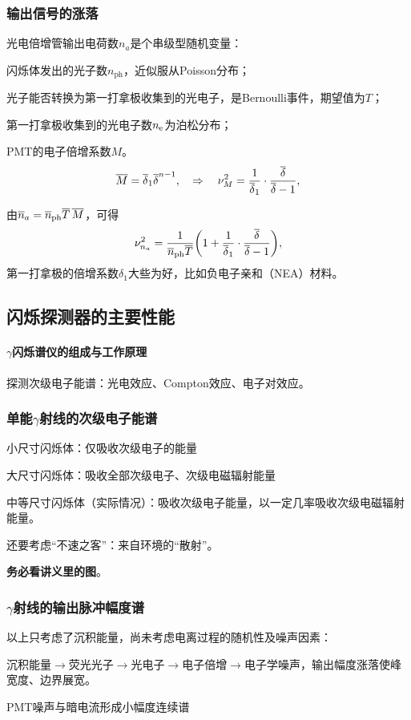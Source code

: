 \subsubsection{输出信号的涨落}
光电倍增管输出电荷数$n_a$是个串级型随机变量：
\begin{compactitem}
	\item 闪烁体发出的光子数$n_{\mathrm{ph}}$，近似服从Poisson分布；
	\item 光子能否转换为第一打拿极收集到的光电子，是Bernoulli事件，期望值为$T$；
	\item 第一打拿极收集到的光电子数$n_\mathrm e$为泊松分布；
	\item PMT的电子倍增系数$M$。
	\[
		\overline M=\overline\delta_1\overline\delta^{n-1},\quad\Rightarrow\quad\nu_M^2=\frac1{\overline\delta_1}\cdot\frac{\overline\delta}{\overline\delta-1},
	\]
\end{compactitem}
由$\overline n_a=\overline n_{\mathrm{ph}}\overline T\,\overline M$，可得 
\begin{align}
	\nu_{n_a}^2=\frac1{\overline n_{\mathrm{ph}}\overline T}\biggl(1+\frac1{\overline\delta_1}\cdot\frac{\overline\delta}{\overline\delta-1}\biggr),
\end{align}
第一打拿极的倍增系数$\delta_1$大些为好，比如负电子亲和（NEA）材料。
\subsection{闪烁探测器的主要性能}
\paragraph{$\gamma$闪烁谱仪的组成与工作原理}
探测次级电子能谱：光电效应、Compton效应、电子对效应。
\subsubsection[单能\textit{\textgamma}射线的次级电子能谱]{单能$\gamma$射线的次级电子能谱}
\begin{compactitem}
	\item 小尺寸闪烁体：仅吸收次级电子的能量
	\item 大尺寸闪烁体：吸收全部次级电子、次级电磁辐射能量
	\item 中等尺寸闪烁体（实际情况）：吸收次级电子能量，以一定几率吸收次级电磁辐射能量。
\end{compactitem}
还要考虑“不速之客”：来自环境的“散射”。

\textbf{务必看讲义里的图}。
\subsubsection[\textit{\textgamma}射线的输出脉冲幅度谱]{$\gamma$射线的输出脉冲幅度谱}
以上只考虑了沉积能量，尚未考虑电离过程的随机性及噪声因素：
\begin{compactitem}
	\item 沉积能量$\to$荧光光子$\to$光电子$\to$电子倍增$\to$电子学噪声，输出幅度涨落使峰宽度、边界展宽。
	\item PMT噪声与暗电流形成小幅度连续谱
\end{compactitem}
